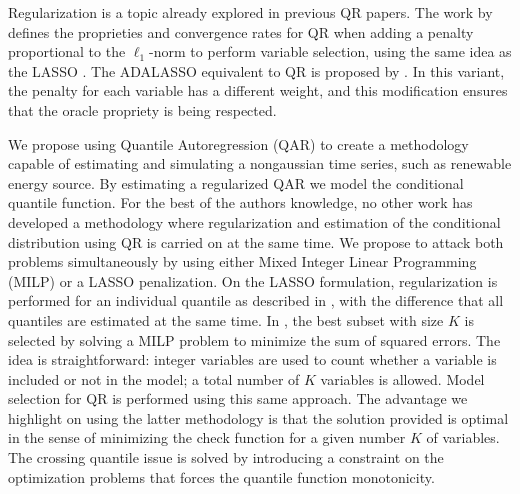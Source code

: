 Regularization is a topic already explored in previous QR papers.
The work by \cite{belloni_l1-penalized_2009} defines the proprieties and convergence rates for QR when adding a penalty proportional to the $\ell_1$-norm to perform variable selection, using the same idea as the LASSO \cite{tibshirani1996regression}. The ADALASSO equivalent to QR is proposed by \cite{ciuperca_adaptive_2016}. In this variant, the penalty for each variable has a different weight, and this modification ensures that the oracle propriety is being respected.

We propose using Quantile Autoregression (QAR) to create a methodology capable of estimating and simulating a nongaussian time series, such as renewable energy source. By estimating a regularized QAR we model the conditional quantile function.
For the best of the authors knowledge, no other work has developed a methodology where regularization and estimation of the conditional distribution using QR is carried on at the same time. 
We propose to attack both problems simultaneously by using either Mixed Integer Linear Programming (MILP) or a LASSO penalization. On the LASSO formulation, regularization is performed for an individual quantile as described in \cite{belloni_l1-penalized_2009}, with the difference that all quantiles are estimated at the same time.
In \cite{bertsimas_best_2015}, the best subset with size $K$ is selected  by solving a MILP problem to minimize the sum of squared errors.
The idea is straightforward: integer variables are used to count whether a variable is included or not in the model; a total number of $K$ variables is allowed.
Model selection for QR is performed using this same approach. The advantage we highlight on using the latter methodology is that the solution provided is optimal in the sense of minimizing the check function for a given number $K$ of variables. The crossing quantile issue is solved by introducing a constraint on the optimization problems that forces the quantile function monotonicity.



